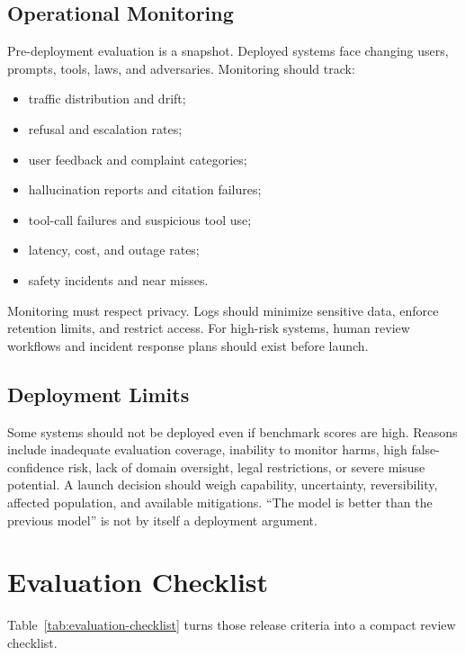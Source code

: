 \subsection{Operational Monitoring}
Pre-deployment evaluation is a snapshot. Deployed systems face changing users, prompts, tools, laws, and adversaries. Monitoring should track:
\begin{itemize}
    \item traffic distribution and drift;
    \item refusal and escalation rates;
    \item user feedback and complaint categories;
    \item hallucination reports and citation failures;
    \item tool-call failures and suspicious tool use;
    \item latency, cost, and outage rates;
    \item safety incidents and near misses.
\end{itemize}
Monitoring must respect privacy. Logs should minimize sensitive data, enforce retention limits, and restrict access. For high-risk systems, human review workflows and incident response plans should exist before launch.

\subsection{Deployment Limits}
Some systems should not be deployed even if benchmark scores are high. Reasons include inadequate evaluation coverage, inability to monitor harms, high false-confidence risk, lack of domain oversight, legal restrictions, or severe misuse potential. A launch decision should weigh capability, uncertainty, reversibility, affected population, and available mitigations. ``The model is better than the previous model'' is not by itself a deployment argument.

\section{Evaluation Checklist}
Table~\ref{tab:evaluation-checklist} turns those release criteria into a compact review checklist.

